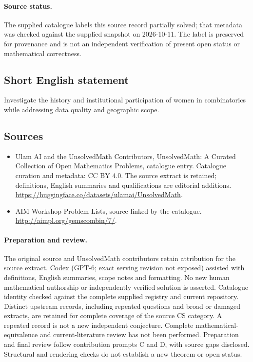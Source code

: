 \documentclass[11pt]{article}
\begin{document}
\paragraph{Source status.}
The supplied catalogue labels this source record partially solved; that metadata was checked against the supplied snapshot on 2026-10-11. The label is preserved for provenance and is not an independent verification of present open status or mathematical correctness.
\subsection{Short English statement}
Investigate the history and institutional participation of women in combinatorics while addressing data quality and geographic scope.
\subsection{Sources}
\begin{itemize}
\item[\hypertarget{source:statement:1}{S1}] Ulam AI and the UnsolvedMath Contributors, UnsolvedMath: A Curated Collection of Open Mathematics Problems, catalogue entry. Catalogue curation and metadata: CC BY 4.0. The source extract is retained; definitions, English summaries and qualifications are editorial additions.
\url{https://huggingface.co/datasets/ulamai/UnsolvedMath}.
\item[\hypertarget{source:statement:2}{S2}] AIM Workshop Problem Lists, source linked by the catalogue.
\url{http://aimpl.org/gemscombin/7/}.
\end{itemize}
\paragraph{Preparation and review.}
The original source and UnsolvedMath contributors retain attribution for the source extract. Codex (GPT-6; exact serving revision not exposed) assisted with definitions, English summaries, scope notes and formatting. No new human mathematical authorship or independently verified solution is asserted. Catalogue identity checked against the complete supplied registry and current repository. Distinct upstream records, including repeated questions and broad or damaged extracts, are retained for complete coverage of the source CS category. A repeated record is not a new independent conjecture. Complete mathematical-equivalence and current-literature review has not been performed. Preparation and final review follow contribution prompts C and D, with source gaps disclosed. Structural and rendering checks do not establish a new theorem or open status.
\label{end:statement}
\end{document}
